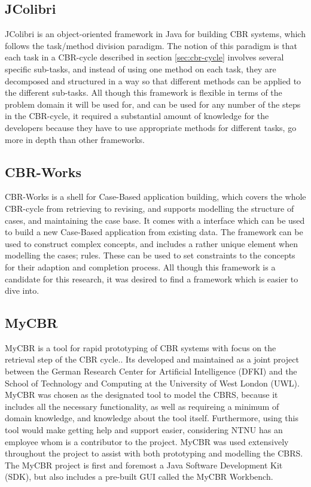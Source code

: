 \subsection{JColibri}
JColibri is an object-oriented framework in Java for building CBR systems, which follows the task/method division paradigm.\cite{bello2004jcolibri} The notion of this paradigm is that each task in a CBR-cycle described in section \ref{sec:cbr-cycle} involves several specific sub-tasks, and instead of using one method on each task, they are decomposed and structured in a way so that different methods can be applied to the different sub-tasks. All though this framework is flexible in terms of the problem domain it will be used for, and can be used for any number of the steps in the CBR-cycle, it required a substantial amount of knowledge for the developers because they have to use appropriate methods for different tasks, go more in depth than other frameworks.


\subsection{CBR-Works}
CBR-Works is a shell for Case-Based application building, which covers the whole CBR-cycle from retrieving to revising, and supports modelling the structure of cases, and maintaining the case base.\cite{schulz1999cbr} It comes with a interface which can be used to build a new Case-Based application from existing data. The framework can be used to construct complex concepts, and includes a rather unique element when modelling the cases; rules. These can be used to set constraints to the concepts for their adaption and completion process. All though this framework is a candidate for this research, it was desired to find a framework which is easier to dive into.

\subsection{MyCBR}
MyCBR is a tool for rapid prototyping of CBR systems with focus on the retrieval step of the CBR cycle.\cite{MyCBR}. Its developed and maintained as a joint project between the German Research Center for Artificial Intelligence (DFKI) and the School of Technology and Computing at the University of West London (UWL)\cite{Stahl2008}. MyCBR was chosen as the designated tool to model the CBRS, because it includes all the necessary functionality, as well as requireing a minimum of domain knowledge, and knowledge about the tool itself. Furthermore, using this tool would make getting help and support easier, considering NTNU has an employee whom is a contributor to the project. MyCBR was used extensively throughout the project to assist with both prototyping and modelling the CBRS. The MyCBR project is first and foremost a Java Software Development Kit (SDK), but also includes a pre-built GUI called the MyCBR Workbench. 

